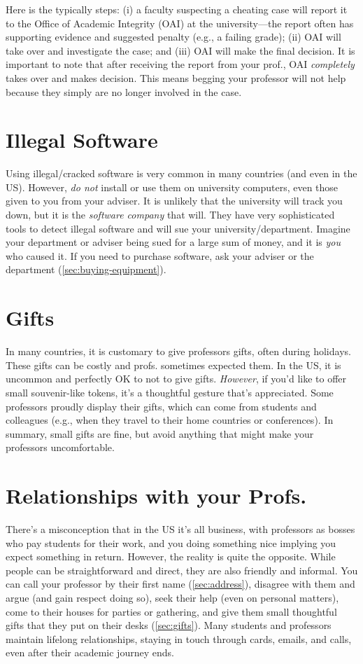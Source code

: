 \documentclass[oneside,11pt,dvipsnames]{book}
\begin{document}
Here is the typically steps: (i) a faculty suspecting a cheating case will report it to the Office of Academic Integrity (OAI) at the university---the report often has supporting evidence and suggested penalty (e.g., a failing grade);  (ii)  OAI will take over and investigate the case; and (iii) OAI will make the final decision.  It is important to note that after receiving the report from your prof., OAI \emph{completely} takes over and makes decision.  This means begging your professor will not help because they simply are no longer involved in the case.

\section{Illegal Software} Using illegal/cracked software is very common in many countries (and even in the US). However, \emph{do not} install or use them on university computers, even those given to you from your adviser.  It is unlikely that the university will track you down, but it is the \emph{software company} that will.  They have very sophisticated tools to detect illegal software and will sue your university/department.  Imagine your department or adviser being sued for a large sum of money, and it is \emph{you} who caused it.  If you need to purchase software,  ask your adviser or the department (\autoref{sec:buying-equipment}).


\section{Gifts}\label{sec:gifts} In many countries, it is customary to give professors gifts, often during holidays.  These gifts can be costly and profs. sometimes expected them. In the US, it is uncommon and perfectly OK to not to give gifts. \emph{However}, if you'd like to offer small souvenir-like tokens, it's a thoughtful gesture that's appreciated. Some professors proudly display their gifts, which can come from students and colleagues (e.g., when they travel to their home countries or conferences). In summary, small gifts are fine, but avoid anything that might make your professors uncomfortable.

\section{Relationships with your Profs.}
There's a misconception that in the US it's all business, with professors as bosses who pay students for their work, and you doing something nice implying you expect something in return. However, the reality is quite the opposite. While people can be straightforward and direct, they are also friendly and informal. You can call your professor by their first name (\autoref{sec:address}), disagree with them and argue (and gain respect doing so), seek their help (even on personal matters), come to their houses for parties or gathering, and give them small thoughtful gifts that they put on their desks (\autoref{sec:gifts}).  Many students and professors maintain lifelong relationships, staying in touch through cards, emails, and calls, even after their academic journey ends. %
\end{document}

